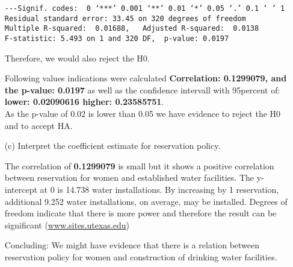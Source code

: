 \documentclass[12pt,letterpaper]{article}
\begin{document}
\begin{enumerate}
\begin{verbatim}
---Signif. codes:  0 ‘***’ 0.001 ‘**’ 0.01 ‘*’ 0.05 ‘.’ 0.1 ‘ ’ 1
Residual standard error: 33.45 on 320 degrees of freedom
Multiple R-squared:  0.01688,	Adjusted R-squared:  0.0138 
F-statistic: 5.493 on 1 and 320 DF,  p-value: 0.0197
\end{verbatim}
Therefore, we would also reject the H0.

Following values indications were calculated  \textbf{Correlation: 0.1299079, and the p-value: 0.0197} as well as the confidence intervall with 95percent of: \textbf{lower:  0.02090616 higher: 0.23585751}. \\

As the p-value of 0.02 is lower than 0.05 we have evidence to reject the H0 and to accept HA.

	\vspace{.5cm}
	\item [(c)] Interpret the coefficient estimate for reservation policy. 
	
	The correlation of \textbf{0.1299079} is small but it shows a positive correlation between reservation for women and established water facilities. The y-intercept at 0 is 14.738 water installations. By increasing by 1 reservation, additional 9.252 water installations, on average, may be installed. Degrees of freedom indicate that there is more power and therefore the result can be significant (\href{https://sites.utexas.edu/sos/degreesfreedom/}{www.sites.utexas.edu})
	
	Concluding: We might have evidence that there is a relation between reservation policy for women and construction of drinking water facilities.
	

	
\end{enumerate}
\end{document}

